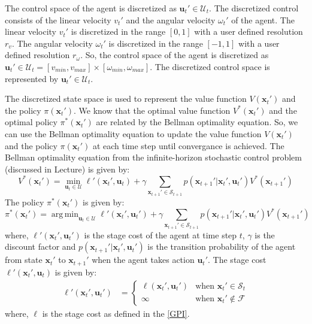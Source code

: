 \documentclass[conference]{IEEEtran}
\DeclareMathOperator*{\argmin}{arg\,min}
\begin{document}
The control space of the agent is discretized as $\mathbf{u}_t' \in \mathcal{U}_t$. The discretized control consists of the linear velocity $v_t'$ and the angular velocity $\omega_t'$ of the agent. The linear velocity $v_t'$ is discretized in the range $[0, 1]$ with a user defined resolution $r_v$. The angular velocity $\omega_t'$ is discretized in the range $[-1, 1]$ with a user defined resolution $r_\omega$. So, the control space of the agent is discretized as $\mathbf{u}_t' \in \mathcal{U}_t = [v_{min}, v_{max}] \times [\omega_{min}, \omega_{max}]$. The discretized control space is represented by $\mathbf{u}_t' \in \mathcal{U}_t$.

The discretized state space is used to represent the value function $V(\mathbf{x}_t')$ and the policy $\pi(\mathbf{x}_t')$. We know that the optimal value function $V^*(\mathbf{x}_t')$ and the optimal policy $\pi^*(\mathbf{x}_t')$ are related by the Bellman optimality equation. 
So, we can use the Bellman optimality equation to update the value function $V(\mathbf{x}_t')$ and the policy $\pi(\mathbf{x}_t')$ at each time step until convergance is achieved.
The Bellman optimality equation from the infinite-horizon stochastic control problem (discussed in Lecture) is given by:
\begin{equation}
    V^*(\mathbf{x}_t') = \min_{\mathbf{u}_t \in \mathcal{U}} \ell'(\mathbf{x}_t', \mathbf{u}_t) + \gamma \sum_{\mathbf{x}_{t+1}' \in \mathcal{S}_{t+1}} p(\mathbf{x}_{t+1}' | \mathbf{x}_t', \mathbf{u}_t') V^*(\mathbf{x}_{t+1}')
\end{equation}
The policy $\pi^*(\mathbf{x}_t')$ is given by:
\begin{equation}
    \pi^*(\mathbf{x}_t') = \argmin_{\mathbf{u}_t \in \mathcal{U}} \ell'(\mathbf{x}_t', \mathbf{u}_t') + \gamma \sum_{\mathbf{x}_{t+1}' \in \mathcal{S}_{t+1}} p(\mathbf{x}_{t+1}' | \mathbf{x}_t', \mathbf{u}_t') V^*(\mathbf{x}_{t+1}')
\end{equation}
where, $\ell'(\mathbf{x}_t', \mathbf{u}_t')$ is the stage cost of the agent at time step $t$, $\gamma$ is the discount factor and $p(\mathbf{x}_{t+1}' | \mathbf{x}_t', \mathbf{u}_t')$ is the transition probability of the agent from state $\mathbf{x}_t'$ to $\mathbf{x}_{t+1}'$ when the agent takes action $\mathbf{u}_t'$.
The stage cost $\ell'(\mathbf{x}_t', \mathbf{u}_t)$ is given by:
\begin{align}
    \ell'(\mathbf{x}_t', \mathbf{u}_t') &= \begin{cases}
        \ell(\mathbf{x}_t', \mathbf{u}_t') & \text{when } \mathbf{x}_t' \in \mathcal{S}_t \\
        \infty & \text{when } \mathbf{x}_t' \notin \mathcal{F}
    \end{cases}
\end{align}
where, $\ell$ is the stage cost as defined in the \ref{GPI}.
\end{document}
